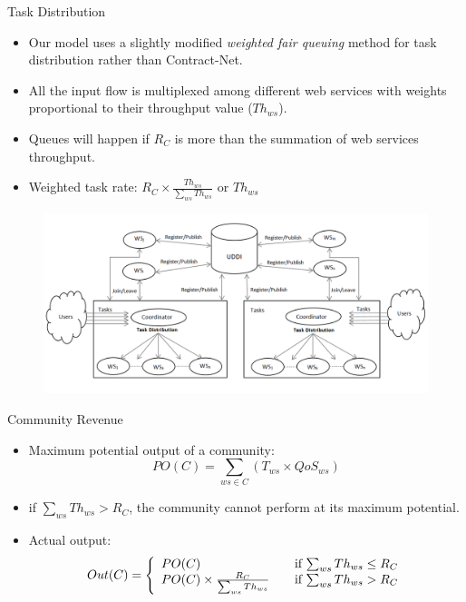 \documentclass{beamer}
\begin{document}
\begin{frame}{Task Distribution}
    \begin{itemize}
        \item Our model uses a slightly modified \emph{weighted fair queuing} method for task distribution rather than Contract-Net.
        \item All the input flow is multiplexed among different web services with weights proportional to their throughput value ($Th_{ws}$).
        \item Queues will happen if $R_C$ is more than the summation of web services throughput.
        \item Weighted task rate: $R_C \times \frac{Th_{ws}}{\sum_{ws}{Th_{ws}}}$ or $Th_{ws}$
    \end{itemize}
    \begin{figure}[htbp]
        \centering
        \includegraphics[width=0.8 \columnwidth]{figures/community.png}
    \end{figure}
\end{frame}

\begin{frame}{Community Revenue}
    \begin{itemize}
        \item Maximum potential output of a community:
            \begin{equation*}
                PO(C) = \sum_{ws \in C}{(T_{ws} \times QoS_{ws})}
            \end{equation*}
        \item if $\sum_{ws}{Th_{ws}} > R_C$, the community cannot perform at its maximum potential.
        \item Actual output:
            \begin{equation}\label{out_c}
                Out(C) = \left\{
                  \begin{array}{l l}
                    PO(C) & \quad \text{if $\sum_{ws}{Th_{ws}} \leq R_{C}$}\\
                    PO(C) \times \frac{R_{C}}{\sum_{ws}{Th_{ws}}} & \quad \text{if $\sum_{ws}{Th_{ws}} > R_{C}$}
                  \end{array} \right.
            \end{equation}
    \end{itemize}
\end{frame}
\end{document}
